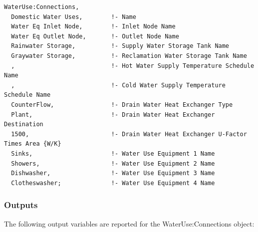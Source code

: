\begin{lstlisting}
WaterUse:Connections,
  Domestic Water Uses,        !- Name
  Water Eq Inlet Node,        !- Inlet Node Name
  Water Eq Outlet Node,       !- Outlet Node Name
  Rainwater Storage,          !- Supply Water Storage Tank Name
  Graywater Storage,          !- Reclamation Water Storage Tank Name
  ,                           !- Hot Water Supply Temperature Schedule Name
  ,                           !- Cold Water Supply Temperature Schedule Name
  CounterFlow,                !- Drain Water Heat Exchanger Type
  Plant,                      !- Drain Water Heat Exchanger Destination
  1500,                       !- Drain Water Heat Exchanger U-Factor Times Area {W/K}
  Sinks,                      !- Water Use Equipment 1 Name
  Showers,                    !- Water Use Equipment 2 Name
  Dishwasher,                 !- Water Use Equipment 3 Name
  Clotheswasher;              !- Water Use Equipment 4 Name
\end{lstlisting}

\subsubsection{Outputs}\label{outputs-1-031}

The following output variables are reported for the WaterUse:Connections object:

